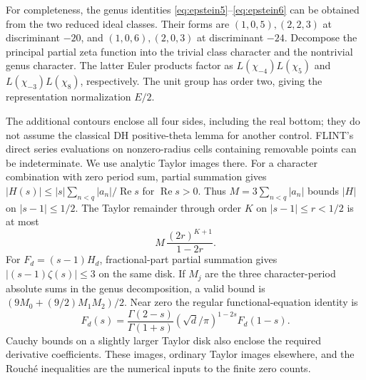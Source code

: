 \documentclass[11pt]{article}
\theoremstyle{remark}
\DeclareMathOperator{\Rea}{Re}
\begin{document}
For completeness, the genus identities
\eqref{eq:epstein5}--\eqref{eq:epstein6} can be obtained from the two
reduced ideal classes. Their forms are \((1,0,5),(2,2,3)\) at discriminant
\(-20\), and \((1,0,6),(2,0,3)\) at discriminant \(-24\).
Decompose the principal partial zeta function into the trivial class
character and the nontrivial genus character. The latter Euler products
factor as \(L(\chi_{-4})L(\chi_5)\) and
\(L(\chi_{-3})L(\chi_8)\), respectively. The unit group has order two,
giving the representation normalization \(E/2\).

The additional contours enclose all four sides, including the real bottom;
they do not assume the classical DH positive-theta lemma for another
control. FLINT's direct series evaluations on nonzero-radius cells
containing removable points can be indeterminate. We use analytic Taylor
images there. For a character combination with zero period sum,
partial summation gives
\(|H(s)|\le |s|\sum_{n<q}|a_n|/\Rea s\) for \(\Rea s>0\).
Thus \(M=3\sum_{n<q}|a_n|\) bounds \(|H|\) on \(|s-1|\le1/2\).
The Taylor remainder through order \(K\) on \(|s-1|\le r<1/2\) is at most
\begin{equation}\label{eq:cauchy}
 M\,\frac{(2r)^{K+1}}{1-2r}.
\end{equation}
For \(F_d=(s-1)H_d\), fractional-part partial summation gives
\(|(s-1)\zeta(s)|\le3\) on the same disk. If \(M_j\) are the three
character-period absolute sums in the genus decomposition, a valid bound is
\((9M_0+(9/2)M_1M_2)/2\).
Near zero the regular functional-equation identity is
\begin{equation}\label{eq:epsteinregular}
 F_d(s)=\frac{\Gamma(2-s)}{\Gamma(1+s)}
          (\sqrt d/\pi)^{1-2s}F_d(1-s).
\end{equation}
Cauchy bounds on a slightly larger Taylor disk also enclose the required
derivative coefficients. These images, ordinary Taylor images elsewhere,
and the Rouché inequalities are the numerical inputs to the finite zero
counts.
\end{document}
